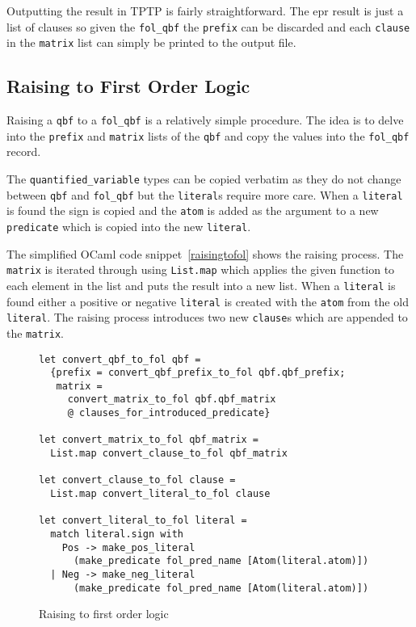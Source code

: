 Outputting the result in TPTP is fairly straightforward. The \gls{epr} result is just a list of clauses so given the \texttt{fol\_qbf} the \texttt{prefix} can be discarded and each \texttt{clause} in the \texttt{matrix} list can simply be printed to the output file.

\subsection{Raising to First Order Logic}
Raising a \texttt{qbf} to a \texttt{fol\_qbf} is a relatively simple procedure. The idea is to delve into the \texttt{prefix} and \texttt{matrix} lists of the \texttt{qbf} and copy the values into the \texttt{fol\_qbf} record.

The \texttt{quantified\_variable} types can be copied verbatim as they do not change between \texttt{qbf} and \texttt{fol\_qbf} but the \texttt{literal}s require more care. When a \texttt{literal} is found the sign is copied and the \texttt{atom} is added as the argument to a new \texttt{predicate} which is copied into the new \texttt{literal}.

The simplified OCaml code snippet~\ref{raisingtofol} shows the raising process. The \texttt{matrix} is iterated through using \texttt{List.map} which applies the given function to each element in the list and puts the result into a new list. When a \texttt{literal} is found either a positive or negative \texttt{literal} is created with the \texttt{atom} from the old \texttt{literal}. The raising process introduces two new \texttt{clause}s which are appended to the \texttt{matrix}.

\begin{figure}[h]
\caption{Raising to first order logic}
\begin{CenteredBox}
\begin{lstlisting}[language=caml, label=raisingtofol]
let convert_qbf_to_fol qbf =
  {prefix = convert_qbf_prefix_to_fol qbf.qbf_prefix;
   matrix = 
     convert_matrix_to_fol qbf.qbf_matrix 
     @ clauses_for_introduced_predicate}

let convert_matrix_to_fol qbf_matrix =
  List.map convert_clause_to_fol qbf_matrix

let convert_clause_to_fol clause =
  List.map convert_literal_to_fol clause

let convert_literal_to_fol literal =
  match literal.sign with
    Pos -> make_pos_literal 
      (make_predicate fol_pred_name [Atom(literal.atom)])
  | Neg -> make_neg_literal 
      (make_predicate fol_pred_name [Atom(literal.atom)])
\end{lstlisting}
\end{CenteredBox}
\end{figure}

